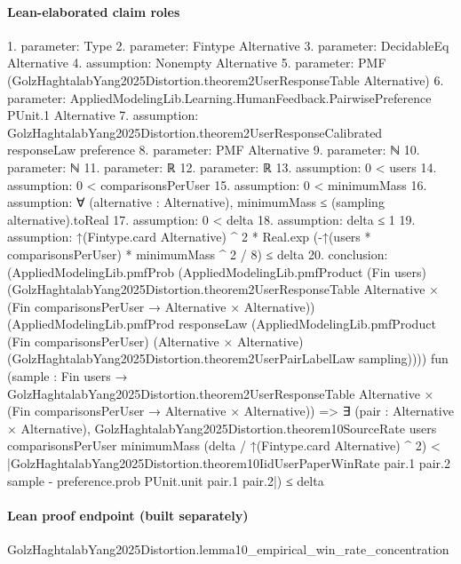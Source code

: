 \documentclass[10pt]{article}
\begin{document}
\paragraph{Lean-elaborated claim roles}\begin{ReviewVerbatim}
1. parameter: Type
2. parameter: Fintype Alternative
3. parameter: DecidableEq Alternative
4. assumption: Nonempty Alternative
5. parameter: PMF (GolzHaghtalabYang2025Distortion.theorem2UserResponseTable Alternative)
6. parameter: AppliedModelingLib.Learning.HumanFeedback.PairwisePreference PUnit.{1} Alternative
7. assumption: GolzHaghtalabYang2025Distortion.theorem2UserResponseCalibrated responseLaw preference
8. parameter: PMF Alternative
9. parameter: ℕ
10. parameter: ℕ
11. parameter: ℝ
12. parameter: ℝ
13. assumption: 0 < users
14. assumption: 0 < comparisonsPerUser
15. assumption: 0 < minimumMass
16. assumption: ∀ (alternative : Alternative), minimumMass ≤ (sampling alternative).toReal
17. assumption: 0 < delta
18. assumption: delta ≤ 1
19. assumption: ↑(Fintype.card Alternative) ^ 2 * Real.exp (-↑(users * comparisonsPerUser) * minimumMass ^ 2 / 8) ≤ delta
20. conclusion: (AppliedModelingLib.pmfProb
    (AppliedModelingLib.pmfProduct (Fin users)
      (GolzHaghtalabYang2025Distortion.theorem2UserResponseTable Alternative ×
        (Fin comparisonsPerUser → Alternative × Alternative))
      (AppliedModelingLib.pmfProd responseLaw
        (AppliedModelingLib.pmfProduct (Fin comparisonsPerUser) (Alternative × Alternative)
          (GolzHaghtalabYang2025Distortion.theorem2UserPairLabelLaw sampling))))
    fun
      (sample :
        Fin users →
          GolzHaghtalabYang2025Distortion.theorem2UserResponseTable Alternative ×
            (Fin comparisonsPerUser → Alternative × Alternative)) =>
    ∃ (pair : Alternative × Alternative),
      GolzHaghtalabYang2025Distortion.theorem10SourceRate users comparisonsPerUser minimumMass
          (delta / ↑(Fintype.card Alternative) ^ 2) <
        |GolzHaghtalabYang2025Distortion.theorem10IidUserPaperWinRate pair.1 pair.2 sample -
            preference.prob PUnit.unit pair.1 pair.2|) ≤
  delta
\end{ReviewVerbatim}

\paragraph{Lean proof endpoint (built separately)}\begin{ReviewVerbatim}
GolzHaghtalabYang2025Distortion.lemma10_empirical_win_rate_concentration
\end{ReviewVerbatim}
\end{document}

